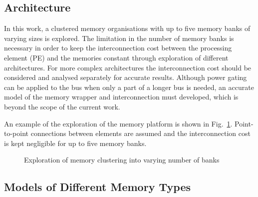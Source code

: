 \documentclass{acm_proc_article-sp}
\begin{document}
\subsection{Architecture}

In this work, a clustered memory organisations with up to five memory banks of varying sizes is explored. The limitation in the number of memory banks is necessary in order to keep the interconnection cost between the processing element (PE) and the memories constant through exploration of different architectures. For more complex architectures the interconnection cost should be considered and analysed separately for accurate results. Although power gating can be applied to the bus when only a part of a longer bus is needed, an accurate model of the memory wrapper and interconnection must developed, which is beyond the scope of the current work. 

An example of the exploration of the memory platform is shown in Fig.~\ref{fig:platform}. Point-to-point connections between elements are assumed and the interconnection cost is kept negligible for up to five memory banks.

\begin{figure}[!t]
\centering
\caption{Exploration of memory clustering into varying number of banks}
\label{fig:platform}
\end{figure}

\subsection{Models of Different Memory Types}
\end{document}
